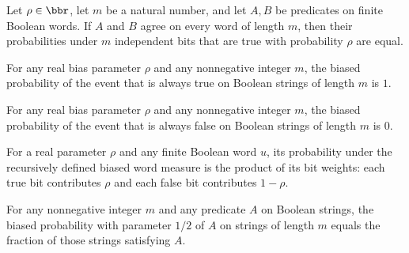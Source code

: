 \begin{theorem}
\label{Randomized.biasedProb_congr}
\leanok
{}
Let $\rho\in\bbr$, let $m$ be a natural number, and let $A,B$ be predicates on finite
Boolean words. If $A$ and $B$ agree on every word of length $m$, then their
probabilities under $m$ independent bits that are true with probability $\rho$ are
equal.
\end{theorem}

\begin{theorem}
\label{Randomized.biasedProb_true}
\leanok
{}
For any real bias parameter $\rho$ and any nonnegative integer $m$, the biased
probability of the event that is always true on Boolean strings of length $m$ is $1$.
\end{theorem}

\begin{theorem}
\label{Randomized.biasedProb_false}
\leanok
{}
For any real bias parameter $\rho$ and any nonnegative integer $m$, the biased
probability of the event that is always false on Boolean strings of length $m$ is $0$.
\end{theorem}

\begin{theorem}
\label{Randomized.biasedProb_word}
\leanok
{}
For a real parameter $\rho$ and any finite Boolean word $u$, its probability under the
recursively defined biased word measure is the product of its bit weights: each true bit
contributes $\rho$ and each false bit contributes $1-\rho$.
\end{theorem}

\begin{theorem}
\label{Randomized.biasedProb_half}
\leanok
{}
For any nonnegative integer $m$ and any predicate $A$ on Boolean strings, the biased
probability with parameter $1/2$ of $A$ on strings of length $m$ equals the fraction of
those strings satisfying $A$.
\end{theorem}

